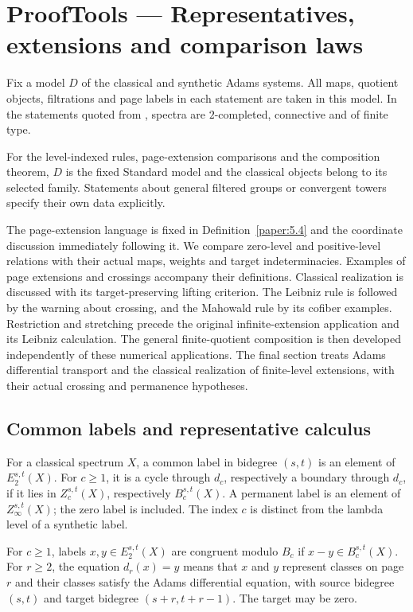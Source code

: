 \chapter{ProofTools — Representatives, extensions and comparison laws}
Fix a model $D$ of the classical and synthetic Adams systems. All maps, quotient objects, filtrations and page labels in each statement are taken in this model. In the statements quoted from \cite{LWX126}, spectra are $2$-completed, connective and of finite type.

For the level-indexed rules, page-extension comparisons and the
composition theorem, $D$ is the fixed Standard model and the classical
objects belong to its selected family. Statements about general filtered
groups or convergent towers specify their own data explicitly.

The page-extension language is fixed in
Definition~\ref{paper:5.4} and the coordinate discussion immediately
following it.
We compare zero-level and positive-level relations with their actual maps,
weights and target indeterminacies. Examples of page extensions and
crossings accompany their definitions.
Classical realization is discussed with its target-preserving lifting
criterion. The Leibniz rule is followed by the warning about crossing,
and the Mahowald rule by its cofiber examples. Restriction and stretching
precede the original infinite-extension application and its Leibniz
calculation. The general finite-quotient composition is then developed
independently of these numerical applications. The final section treats
Adams differential transport and the classical realization of finite-level
extensions, with their actual crossing and permanence hypotheses.

\section{Common labels and representative calculus}

\begin{definition}
\label{sem:ProofTools:common-labels}
For a classical spectrum $X$, a common label in bidegree $(s,t)$ is an element of $E_2^{s,t}(X)$. For $c\geq1$, it is a cycle through $d_c$, respectively a boundary through $d_c$, if it lies in $Z_c^{s,t}(X)$, respectively $B_c^{s,t}(X)$. A permanent label is an element of $Z_\infty^{s,t}(X)$; the zero label is included. The index $c$ is distinct from the lambda level of a synthetic label.

For $c\geq1$, labels $x,y\in E_2^{s,t}(X)$ are congruent modulo $B_c$ if $x-y\in B_c^{s,t}(X)$. For $r\geq2$, the equation $d_r(x)=y$ means that $x$ and $y$ represent classes on page $r$ and their classes satisfy the Adams differential equation, with source bidegree $(s,t)$ and target bidegree $(s+r,t+r-1)$. The target may be zero.
\end{definition}

